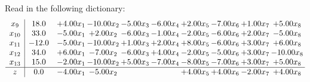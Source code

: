 \documentclass[9pt]{article}
\begin{document}
Read in the following dictionary:
\[\begin{array}{c| c c@{\hskip 2pt} c@{\hskip 2pt} c@{\hskip 2pt} c@{\hskip 2pt} c@{\hskip 2pt} c@{\hskip 2pt} c@{\hskip 2pt} c@{\hskip 2pt} }
 x_{9}   &  18.0 & +  4.00 x_{1} & -10.00 x_{2} & -5.00 x_{3} & -6.00 x_{4} & +  2.00 x_{5} & -7.00 x_{6} & +  1.00 x_{7} & +  5.00 x_{8}\\
 x_{10}   &  33.0 & -5.00 x_{1} & +  2.00 x_{2} & -6.00 x_{3} & -1.00 x_{4} & -2.00 x_{5} & -6.00 x_{6} & +  2.00 x_{7} & -5.00 x_{8}\\
 x_{11}   &  -12.0 & -5.00 x_{1} & -10.00 x_{2} & +  1.00 x_{3} & +  2.00 x_{4} & +  8.00 x_{5} & -6.00 x_{6} & +  3.00 x_{7} & +  6.00 x_{8}\\
 x_{12}   &  34.0 & +  6.00 x_{1} & -7.00 x_{2} & -6.00 x_{3} & +  4.00 x_{4} & -2.00 x_{5} & -5.00 x_{6} & +  3.00 x_{7} & -10.00 x_{8}\\
 x_{13}   &  15.0 & -2.00 x_{1} & -10.00 x_{2} & +  5.00 x_{3} & -7.00 x_{4} & -8.00 x_{5} & -7.00 x_{6} & +  3.00 x_{7} & +  5.00 x_{8}\\
\hline
z    &  0.0 & -4.00 x_{1} & -5.00 x_{2} &    &   & +  4.00 x_{5} & +  4.00 x_{6} & -2.00 x_{7} & +  4.00 x_{8}\\
\end{array}\]
\end{document}
